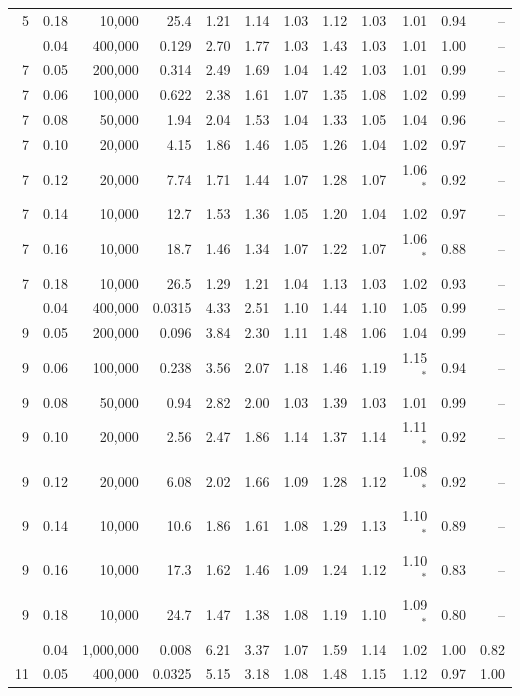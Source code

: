 \documentclass[journal]{IEEEtran}
\begin{document}
\begin{table}[t]
\begin{tabular}{rrrrrrrrrrrr}
5 & 0.18 & 10{,}000 & 25.4 & 1.21 & 1.14 & 1.03 & 1.12 & 1.03 & 1.01 & 0.94 & -- \\
\addlinespace
7 & 0.04 & 400{,}000 & 0.129 & 2.70 & 1.77 & 1.03 & 1.43 & 1.03 & 1.01 & 1.00 & -- \\
7 & 0.05 & 200{,}000 & 0.314 & 2.49 & 1.69 & 1.04 & 1.42 & 1.03 & 1.01 & 0.99 & -- \\
7 & 0.06 & 100{,}000 & 0.622 & 2.38 & 1.61 & 1.07 & 1.35 & 1.08 & 1.02 & 0.99 & -- \\
7 & 0.08 & 50{,}000 & 1.94 & 2.04 & 1.53 & 1.04 & 1.33 & 1.05 & 1.04 & 0.96 & -- \\
7 & 0.10 & 20{,}000 & 4.15 & 1.86 & 1.46 & 1.05 & 1.26 & 1.04 & 1.02 & 0.97 & -- \\
7 & 0.12 & 20{,}000 & 7.74 & 1.71 & 1.44 & 1.07 & 1.28 & 1.07 & 1.06$^{*}$ & 0.92 & -- \\
7 & 0.14 & 10{,}000 & 12.7 & 1.53 & 1.36 & 1.05 & 1.20 & 1.04 & 1.02 & 0.97 & -- \\
7 & 0.16 & 10{,}000 & 18.7 & 1.46 & 1.34 & 1.07 & 1.22 & 1.07 & 1.06$^{*}$ & 0.88 & -- \\
7 & 0.18 & 10{,}000 & 26.5 & 1.29 & 1.21 & 1.04 & 1.13 & 1.03 & 1.02 & 0.93 & -- \\
\addlinespace
9 & 0.04 & 400{,}000 & 0.0315 & 4.33 & 2.51 & 1.10 & 1.44 & 1.10 & 1.05 & 0.99 & -- \\
9 & 0.05 & 200{,}000 & 0.096 & 3.84 & 2.30 & 1.11 & 1.48 & 1.06 & 1.04 & 0.99 & -- \\
9 & 0.06 & 100{,}000 & 0.238 & 3.56 & 2.07 & 1.18 & 1.46 & 1.19 & 1.15$^{*}$ & 0.94 & -- \\
9 & 0.08 & 50{,}000 & 0.94 & 2.82 & 2.00 & 1.03 & 1.39 & 1.03 & 1.01 & 0.99 & -- \\
9 & 0.10 & 20{,}000 & 2.56 & 2.47 & 1.86 & 1.14 & 1.37 & 1.14 & 1.11$^{*}$ & 0.92 & -- \\
9 & 0.12 & 20{,}000 & 6.08 & 2.02 & 1.66 & 1.09 & 1.28 & 1.12 & 1.08$^{*}$ & 0.92 & -- \\
9 & 0.14 & 10{,}000 & 10.6 & 1.86 & 1.61 & 1.08 & 1.29 & 1.13 & 1.10$^{*}$ & 0.89 & -- \\
9 & 0.16 & 10{,}000 & 17.3 & 1.62 & 1.46 & 1.09 & 1.24 & 1.12 & 1.10$^{*}$ & 0.83 & -- \\
9 & 0.18 & 10{,}000 & 24.7 & 1.47 & 1.38 & 1.08 & 1.19 & 1.10 & 1.09$^{*}$ & 0.80 & -- \\
\addlinespace
11 & 0.04 & 1{,}000{,}000 & 0.008 & 6.21 & 3.37 & 1.07 & 1.59 & 1.14 & 1.02 & 1.00 & 0.82 \\
11 & 0.05 & 400{,}000 & 0.0325 & 5.15 & 3.18 & 1.08 & 1.48 & 1.15 & 1.12 & 0.97 & 1.00 \\

\end{tabular}
\end{table}
\end{document}

